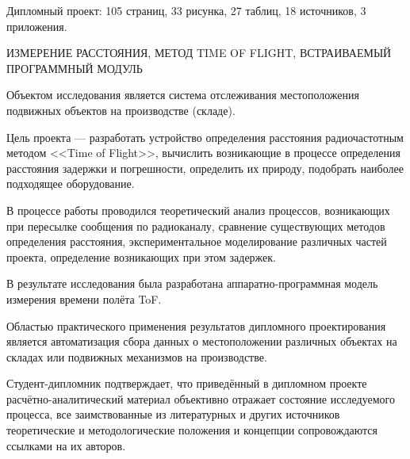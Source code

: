 Дипломный проект: 105 страниц, 33 рисунка, 27 таблиц, 18 источников, 3 приложения.

ИЗМЕРЕНИЕ РАССТОЯНИЯ, МЕТОД TIME OF FLIGHT, ВСТРАИВАЕМЫЙ ПРОГРАММНЫЙ МОДУЛЬ

Объектом исследования является система отслеживания местоположения подвижных объектов на производстве (складе).

Цель проекта --- разработать устройство определения расстояния радиочастотным методом <<Time of Flight>>, вычислить возникающие в процессе определения расстояния задержки и погрешности, определить их природу, подобрать наиболее подходящее оборудование.

В процессе работы проводился теоретический анализ процессов, возникающих при пересылке сообщения по радиоканалу, сравнение существующих методов определения расстояния, экспериментальное моделирование различных частей проекта, определение возникающих при этом задержек.

В результате исследования была разработана аппаратно-программная модель измерения времени полёта ToF.

Областью практического применения результатов дипломного проектирования является автоматизация сбора данных о местоположении различных объектах на складах или подвижных механизмов на производстве.

Студент-дипломник подтверждает, что приведённый в дипломном проекте расчётно-аналитический материал объективно отражает состояние исследуемого процесса, все заимствованные из литературных и других источников теоретические и методологические положения и концепции сопровождаются ссылками на их авторов.
